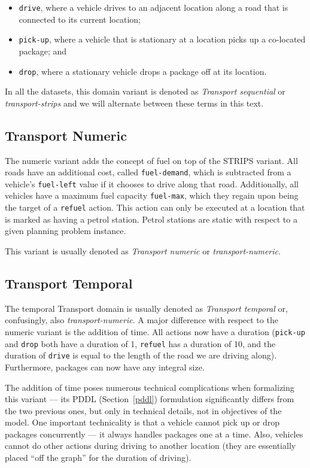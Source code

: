 \begin{itemize}
\item \verb+drive+, where a vehicle drives to an adjacent location
along a road that is connected to its current location;
\item \verb+pick-up+, where a vehicle that is stationary at a location picks up a co-located package; and
\item \verb+drop+, where a stationary vehicle drops a package off at its location.
\end{itemize}

In all the datasets, this domain variant is denoted as \textit{Transport sequential}
or \textit{transport-strips} and we will alternate between these terms in this text.

\subsection{Transport Numeric}\label{transport-numeric}

The numeric variant adds the concept of fuel on top of the STRIPS variant.
All roads have an additional cost, called \verb+fuel-demand+, which is
subtracted from a vehicle's \verb+fuel-left+ value if it chooses to drive along that road.
Additionally, all vehicles have a maximum fuel capacity \verb+fuel-max+,
which they regain upon being the target of a \verb+refuel+ action. This action can only
be executed at a location that is marked as having a petrol station. Petrol stations
are static with respect to a given planning problem instance.

This variant is usually denoted as \textit{Transport numeric} or \textit{transport-numeric}.

\subsection{Transport Temporal}\label{transport-temporal}

The temporal Transport domain is usually denoted as \textit{Transport temporal} or, confusingly,
also \textit{transport-numeric}. A major difference with respect to the numeric variant is
the addition of time. All actions now have a duration (\verb+pick-up+ and \verb+drop+ both have a
duration of 1, \verb+refuel+ has a duration of 10, and the duration of \verb+drive+ is
equal to the length of the road we are driving along). Furthermore, packages can now have any integral size.

The addition of time poses numerous technical complications when formalizing this variant
--- its PDDL (Section~\ref{pddl}) formulation significantly differs from the two previous ones, but only in technical details, not in objectives of the model.
One important technicality is that a vehicle cannot pick up or drop packages concurrently --- it always handles packages one at a time. Also, vehicles cannot do other actions during driving to another location (they are essentially placed ``off the graph'' for the duration of driving).

